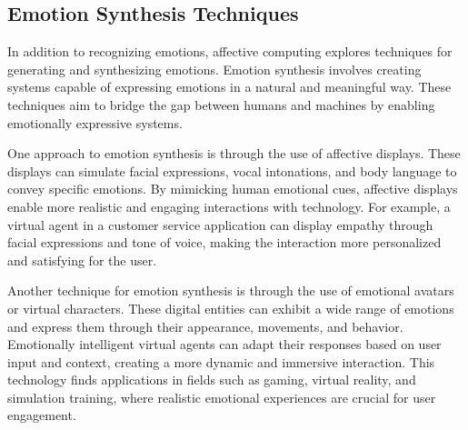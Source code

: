 \subsection{Emotion Synthesis Techniques}
In addition to recognizing emotions, affective computing explores techniques for generating and synthesizing emotions. 
Emotion synthesis involves creating systems capable of expressing emotions in a natural and meaningful way. 
These techniques aim to bridge the gap between humans and machines by enabling emotionally expressive systems.


One approach to emotion synthesis is through the use of affective displays. These displays can simulate facial expressions, vocal intonations, 
and body language to convey specific emotions. By mimicking human emotional cues, affective displays enable more realistic and engaging interactions with technology. 
For example, a virtual agent in a customer service application can display empathy through facial expressions and tone of voice, 
making the interaction more personalized and satisfying for the user.


Another technique for emotion synthesis is through the use of emotional avatars or virtual characters. 
These digital entities can exhibit a wide range of emotions and express them through their appearance, movements, and behavior. 
Emotionally intelligent virtual agents can adapt their responses based on user input and context, creating a more dynamic and immersive interaction. 
This technology finds applications in fields such as gaming, virtual reality, and simulation training, where realistic emotional experiences are crucial for user engagement.